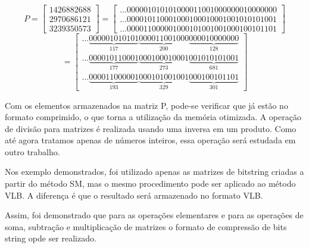 \documentclass[12pt]{article}
\begin{document}
\begin{equation}
	P = \begin{bmatrix}
			1426882688\\ 
			2970686121\\ 
			3239350573
		\end{bmatrix} 
        =
        \begin{bmatrix}
   			\ldots000001010101000011001000000010000000 \\
			\ldots000010110001000100010001001010101001\\
			\ldots000011000001000101001001000100101101
		\end{bmatrix}
\end{equation}
\begin{equation}
        =
        \begin{bmatrix}

\ldots\underbrace{000001010101}_{117}\underbrace{000011001000}_{200}\underbrace{
000010000000}_{128}\\ 			 

\ldots\underbrace{000010110001}_{177}\underbrace{000100010001}_{273}\underbrace{
001010101001}_{681}\\ 			 

\ldots\underbrace{000011000001}_{193}\underbrace{000101001001}_{329}\underbrace{
000100101101}_{301} 			 
		\end{bmatrix}
\end{equation}

Com os elementos armazenados na matriz P, pode-se verificar que  já estão no
formato comprimido, o que torna a utilização da memória otimizada. A operação de
divisão para matrizes é realizada usando uma inversa em um produto. Como até
agora tratamos apenas de números inteiros, essa operação será estudada em outro
trabalho.

Nos exemplo demonstrados, foi utilizado apenas as matrizes de bitstring criadas
a partir do método SM, mas o mesmo procedimento pode ser aplicado ao método VLB.
A diferença é que o resultado será armazenado no formato VLB.

Assim, foi demonstrado que para as operações elementares e para as operações de
soma, subtração e multiplicação de matrizes o formato de compressão de bits
string opde ser realizado.
\end{document}
